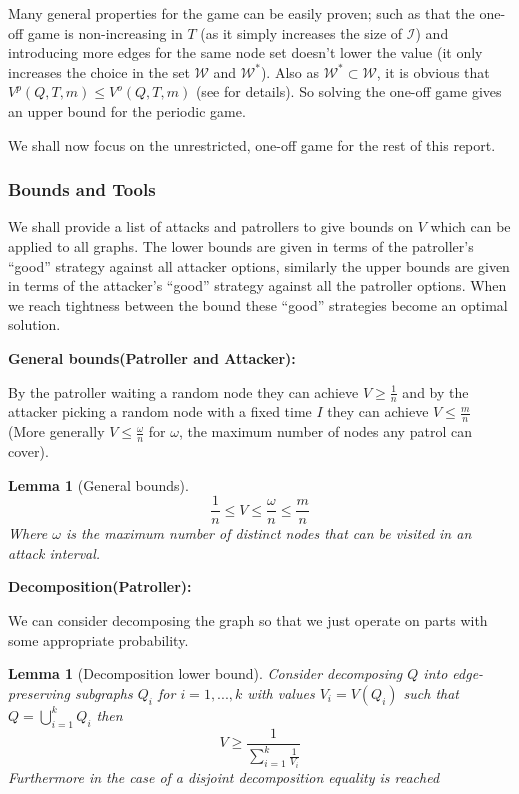 \documentclass[a4paper,10pt]{article}
\newtheorem{lemma}[theorem]{Lemma}
\theoremstyle{definition}
\theoremstyle{definition}
\theoremstyle{remark}
\theoremstyle{definition}
\begin{document}
Many general properties for the game can be easily proven; such as that the one-off game is non-increasing in $T$ (as it simply increases the size of $\mathcal{I}$) and introducing more edges for the same node set doesn't lower the value (it only increases the choice in the set $\mathcal{W}$ and $\mathcal{W}^*$). Also as $\mathcal{W}^* \subset \mathcal{W}$, it is obvious that $V^{p} (Q,T,m) \leq V^{o} (Q,T,m)$ (see \cite{Alpern2011} for details). So solving the one-off game gives an upper bound for the periodic game.

We shall now focus on the unrestricted, one-off game for the rest of this report.

\subsubsection{Bounds and Tools}
We shall provide a list of attacks and patrollers to give bounds on $V$ which can be applied to all graphs. The lower bounds are given in terms of the patroller's ``good'' strategy against all attacker options, similarly the upper bounds are given in terms of the attacker's ``good'' strategy against all the patroller options. When we reach tightness between the bound these ``good'' strategies become an optimal solution.

\textbf{General bounds(Patroller and Attacker):}

By the patroller waiting a random node they can achieve $V \geq \frac{1}{n}$ and by the attacker picking a random node with a fixed time $I$ they can achieve $V \leq \frac{m}{n}$ (More generally $V \leq \frac{\omega}{n}$ for $\omega$, the maximum number of nodes any patrol can cover).

\begin{lemma}[General bounds]
$$\frac{1}{n} \leq V \leq \frac{\omega}{n} \leq \frac{m}{n}$$
Where $\omega$ is the maximum number of distinct nodes that can be visited in an attack interval.
\end{lemma}

\textbf{Decomposition(Patroller):}

We can consider decomposing the graph so that we just operate on parts with some appropriate probability.

\begin{lemma}[Decomposition lower bound]
Consider decomposing $Q$ into edge-preserving subgraphs $Q_{i}$ for $i=1,...,k$ with values $V_{i}=V(Q_{i})$ such that $Q=\bigcup\limits_{i=1}^{k} Q_{i}$ then
$$V \geq \frac{1}{\sum\limits_{i=1}^{k} \frac{1}{V_{i}}} $$
Furthermore in the case of a disjoint decomposition equality is reached
\end{lemma}
\end{document}
